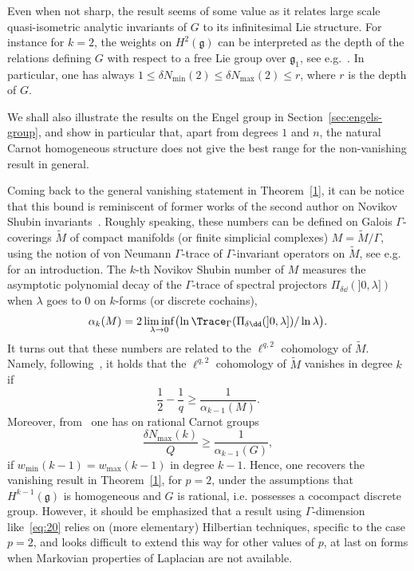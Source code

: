 Even when not sharp, the result seems of some value as it relates large scale quasi-isometric analytic invariants of $G$ to its infinitesimal Lie structure. For instance for $k=2$, the weights on $H^2(\mathfrak{g})$ can be interpreted as the depth of the relations defining $G$ with respect to a free Lie group over $\mathfrak{g}_1$, see e.g.~\cite{Rumin_TSG}. In particular, one has always $1\leq \delta N_{\min}(2) \leq \delta N_{\max}(2) \leq r$, where $r$ is the depth of $G$.


We shall also illustrate the results on the Engel group in Section~\ref{sec:engels-group}, and show in particular that, apart from degrees $1$ and $n$, the natural Carnot homogeneous structure does not give the best range for the non-vanishing result in general.


Coming back to the general vanishing statement in Theorem~\ref{1}, it can be notice that this bound is reminiscent of former works of the second author on Novikov Shubin invariants~\cite{Rumin_TSG, Rumin10}. Roughly speaking, these numbers can be defined on Galois $\Gamma$-coverings $\widetilde M$ of compact manifolds (or finite simplicial complexes) $M = \widetilde M / \Gamma$, using the notion of von Neumann $\Gamma$-trace of $\Gamma$-invariant operators on $\widetilde M$, see e.g.~\cite[Section~1]{Rumin_TSG} for an introduction. The $k$-th Novikov Shubin number of $M$ measures the asymptotic polynomial decay of the $\Gamma$-trace of spectral projectors $\Pi_{\delta \dd} (]0, \lambda])$ when $\lambda $ goes to $0$ on $k$-forms (or discrete cochains),
\begin{equation*}
\alpha_k(M) = 2 \liminf_{\lambda \rightarrow 0}\bigl(\ln
\Trace_\Gamma (\Pi_{\delta \dd} (\mathopen{]}0, \lambda]) / \ln \lambda \bigr).
\end{equation*}
It turns out that these numbers are related to the $\ell^{q,2}$ cohomology of $\widetilde M$. Namely, following~\cite[Theorem~1.10]{Rumin10}, it holds that the $\ell^{q,2}$ cohomology of $\widetilde M$ vanishes in degree $k$ if
\begin{equation}\label{eq:20}
\frac{1}{2} - \frac{1}{q} \geq \frac{1}{\alpha_{k-1}(M)}.
\end{equation}
Moreover, from~\cite[Theorem~3.13]{Rumin_TSG} one has on rational Carnot groups
\begin{equation*}
\frac{\delta N_{\max}(k)}{Q} \geq \frac{1}{\alpha_{k-1}(G)},
\end{equation*}
if $w_{\min}(k-1)= w_{\max}(k-1)$ in degree $k-1$. Hence, one recovers the vanishing result in Theorem~\ref{1}, for $p=2$, under the assumptions that $H^{k-1}(\mathfrak{g})$ is homogeneous and $G$ is rational, i.e. possesses a cocompact discrete group. However, it should be emphasized that a result using $\Gamma$-dimension like~\eqref{eq:20} relies on (more elementary) Hilbertian techniques, specific to the case $p=2$, and looks difficult to extend this way for other values of $p$, at last on forms when Markovian properties of Laplacian are not available.

